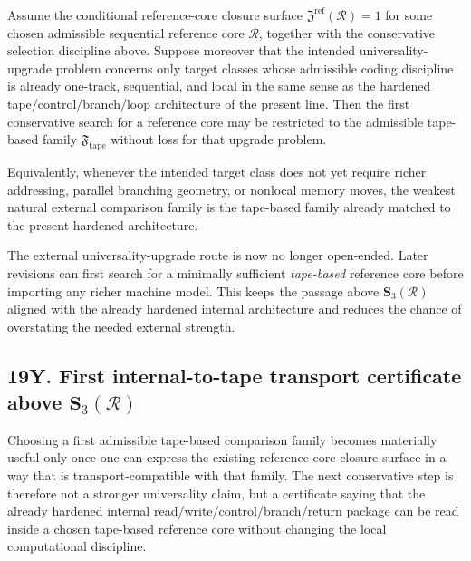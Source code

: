 \begin{proposition}
Assume the conditional reference-core closure surface \(\mathfrak Z^{\mathrm{ref}}(\mathcal R)=1\) for some chosen admissible sequential reference core \(\mathcal R\), together with the conservative selection discipline above. Suppose moreover that the intended universality-upgrade problem concerns only target classes whose admissible coding discipline is already one-track, sequential, and local in the same sense as the hardened tape/control/branch/loop architecture of the present line. Then the first conservative search for a reference core may be restricted to the admissible tape-based family \(\mathfrak F_{\mathrm{tape}}\) without loss for that upgrade problem.

Equivalently, whenever the intended target class does not yet require richer addressing, parallel branching geometry, or nonlocal memory moves, the weakest natural external comparison family is the tape-based family already matched to the present hardened architecture.
\end{proposition}

\begin{corollary}
The external universality-upgrade route is now no longer open-ended. Later revisions can first search for a minimally sufficient \emph{tape-based} reference core before importing any richer machine model. This keeps the passage above \(\mathbf S_3(\mathcal R)\) aligned with the already hardened internal architecture and reduces the chance of overstating the needed external strength.
\end{corollary}

\subsection*{19Y. First internal-to-tape transport certificate above \(\mathbf S_3(\mathcal R)\)}
Choosing a first admissible tape-based comparison family becomes materially useful only once one can express the existing reference-core closure surface in a way that is transport-compatible with that family. The next conservative step is therefore not a stronger universality claim, but a certificate saying that the already hardened internal read/write/control/branch/return package can be read inside a chosen tape-based reference core without changing the local computational discipline.

